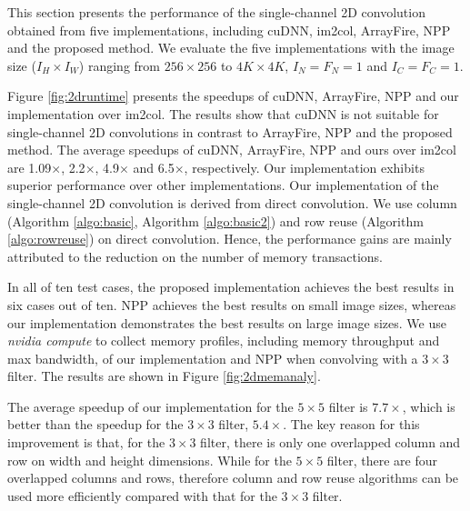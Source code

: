 This section presents the performance of the single-channel 2D convolution obtained from five implementations, including cuDNN, im2col,  ArrayFire,
NPP and the proposed method. We evaluate the five implementations with the image size ($I_H \times I_W$) ranging from $256 \times 256$ to $4K \times 4K$, $I_N=F_N=1$ and $I_C=F_C=1$. 

Figure \ref{fig:2druntime} presents the speedups of cuDNN, ArrayFire, NPP and our implementation over im2col. The results show that cuDNN is not suitable for single-channel 2D convolutions in contrast to ArrayFire, NPP and the proposed method. The average speedups of cuDNN, ArrayFire, NPP and ours over im2col are 1.09$\times$, 2.2$\times$, 4.9$\times$ and 6.5$\times$, respectively. Our implementation exhibits superior performance over other implementations. Our implementation of the single-channel 2D convolution is derived from direct convolution. We use column (Algorithm \ref{algo:basic}, Algorithm \ref{algo:basic2}) and row reuse (Algorithm \ref{algo:rowreuse}) on direct convolution. Hence, the performance gains are mainly attributed to the reduction on the number of memory transactions.

In all of ten test cases, the proposed implementation achieves the best results in six cases out of ten. NPP achieves the best results on small image sizes, whereas our implementation demonstrates the best results on large image sizes. We use \emph{nvidia compute} to collect memory profiles, including memory throughput and max bandwidth, of our implementation and NPP when convolving with a $3 \times 3$ filter. The results are shown in Figure \ref{fig:2dmemanaly}.

The average speedup of our implementation for the $5 \times 5$ filter is $7.7\times$, which is better than the speedup for the $3 \times 3$ filter, $5.4\times$. The key reason for this improvement is that, for the $3 \times 3$ filter, there is only one overlapped column and row on width and height dimensions. While for the $5 \times 5$ filter, there are four overlapped columns and rows, therefore column and row reuse algorithms can be used more efficiently compared with  that for the $3 \times 3$ filter.

